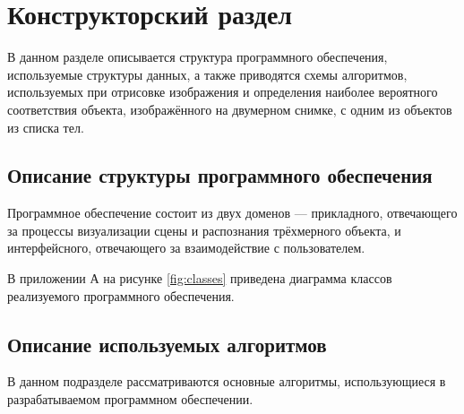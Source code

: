 \chapter{Конструкторский раздел}

В данном разделе описывается структура программного обеспечения, используемые структуры данных, а также приводятся схемы алгоритмов, используемых при отрисовке изображения и определения наиболее вероятного соответствия объекта, изображённого на двумерном снимке, с одним из объектов из списка тел.

\section{Описание структуры программного обеспечения}
Программное обеспечение состоит из двух доменов --- прикладного, отвечающего за процессы визуализации сцены и распознания трёхмерного объекта, и интерфейсного, отвечающего за взаимодействие с пользователем.

В приложении А на рисунке \ref{fig:classes} приведена диаграмма классов реализуемого программного обеспечения.

\section{Описание используемых алгоритмов}
В данном подразделе рассматриваются основные алгоритмы, использующиеся в разрабатываемом программном обеспечении.
